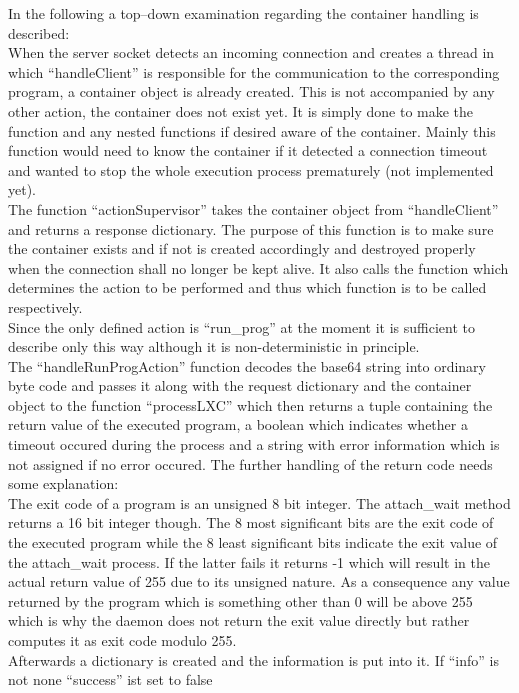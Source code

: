In the following a top--down examination regarding the container handling is described:\\
When the server socket detects an incoming connection and creates a thread in which ``handleClient'' is responsible
for the communication to the corresponding program, a container object is already created. This is not accompanied by
any other action, the container does not exist yet. It is simply done to make the function and any nested functions
if desired aware of the container. Mainly this function would need to know the container if it detected a connection
timeout and wanted to stop the whole execution process prematurely (not implemented yet).\\
The function ``actionSupervisor'' takes the container object from ``handleClient'' and returns a response dictionary.
The purpose of this function is to make sure the container exists and if not is created accordingly and destroyed
properly when the connection shall no longer be kept alive. It also calls the function which determines the action
to be performed and thus which function is to be called respectively.\\
Since the only defined action is ``run\_prog'' at the moment it is sufficient to describe only this way although it is
non-deterministic in principle.\\
The ``handleRunProgAction'' function decodes the base64 string into ordinary byte code and passes it along with the
request dictionary and the container object to the function ``processLXC'' which then returns a tuple containing the return
value of the executed program, a boolean which indicates whether a timeout occured during the process and a string
with error information which is not assigned if no error occured. The further handling of the return code needs some
explanation:\\
The exit code of a program is an unsigned 8 bit integer. The attach\_wait method returns a 16 bit integer though. The 8
most significant bits are the exit code of the executed program while the 8 least significant bits indicate the exit
value of the attach\_wait process. If the latter fails it returns -1 which will result in the actual return value of
255 due to its unsigned nature. As a consequence any value returned by the program which is something other than 0 will be
above 255 which is why the daemon does not return the exit value directly but rather computes it as exit code modulo
255.\\
Afterwards a dictionary is created and the information is put into it. If ``info'' is not none ``success'' ist set to false
